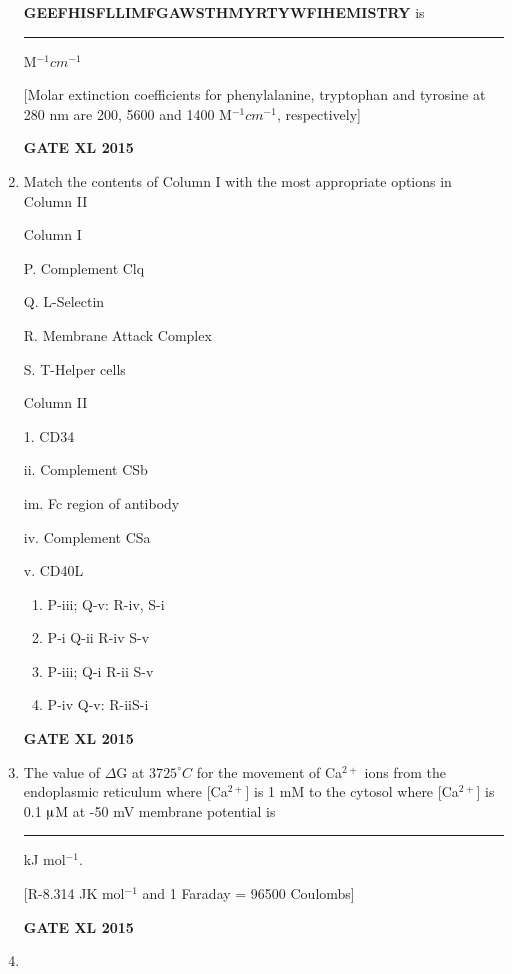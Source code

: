 \documentclass[journal,12pt,onecolumn]{IEEEtran}
\begin{document}
\begin{enumerate}
	\textbf{GEEFHISFLLIMFGAWSTHMYRTYWFIHEMISTRY} is\rule{1cm}{0.15mm} M$^{-1}cm^{-1}$

[Molar extinction coefficients for phenylalanine, tryptophan and tyrosine at 280 nm are 200, 5600 and 1400 M$^{-1}cm^{-1}$, respectively]
\begin{flushright}\textbf{GATE XL 2015}\end{flushright}
\item Match the contents of Column I with the most appropriate options in Column II
	

	\begin{minipage}{0.5\textwidth}
		\begin{flushleft}
Column I

P. Complement Clq

Q. L-Selectin

R. Membrane Attack Complex

S. T-Helper cells
		\end{flushleft}
	\end{minipage}
	\begin{minipage}{0.5\textwidth}
		\begin{flushleft}
Column II

1. CD34

ii. Complement CSb

im. Fc region of antibody

iv. Complement CSa

v. CD40L
		\end{flushleft}
	\end{minipage}

        \begin{enumerate} 
            \item P-iii; Q-v: R-iv, S-i
	    \item P-i Q-ii R-iv S-v
	    \item P-iii; Q-i R-ii S-v
            \item P-iv Q-v: R-iiS-i
	\end{enumerate}
\begin{flushright}\textbf{GATE XL 2015}\end{flushright}
\item The value of $\Delta$G at 37$25^{\circ}C$ for the movement of Ca$^{2+}$ ions from the endoplasmic reticulum where [Ca$^{2+}$] is 1 mM to the cytosol where [Ca$^{2+}$] is 0.1 $\micro$M at -50 mV membrane potential is\rule{1cm}{0.15mm} kJ mol$^{-1}$.

	[R-8.314 JK mol$^{-1}$ and 1 Faraday = 96500 Coulombs]
\begin{flushright}\textbf{GATE XL 2015}\end{flushright}
\item 


\end{enumerate}
\end{document}
